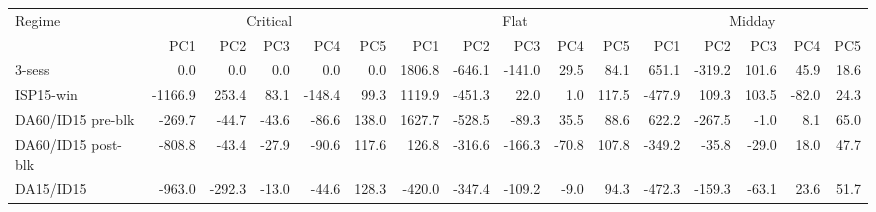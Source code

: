 \begin{tabular}{l r r r r r r r r r r r r r r r}
\toprule
Regime & \multicolumn{5}{c}{Critical} & \multicolumn{5}{c}{Flat} & \multicolumn{5}{c}{Midday} \\
\cmidrule(lr){2-6}\cmidrule(lr){7-11}\cmidrule(lr){12-16}
 & PC1 & PC2 & PC3 & PC4 & PC5 & PC1 & PC2 & PC3 & PC4 & PC5 & PC1 & PC2 & PC3 & PC4 & PC5 \\
\midrule
3-sess & 0.0 & 0.0 & 0.0 & 0.0 & 0.0 & 1806.8 & -646.1 & -141.0 & 29.5 & 84.1 & 651.1 & -319.2 & 101.6 & 45.9 & 18.6 \\
ISP15-win & -1166.9 & 253.4 & 83.1 & -148.4 & 99.3 & 1119.9 & -451.3 & 22.0 & 1.0 & 117.5 & -477.9 & 109.3 & 103.5 & -82.0 & 24.3 \\
DA60/ID15 pre-blk & -269.7 & -44.7 & -43.6 & -86.6 & 138.0 & 1627.7 & -528.5 & -89.3 & 35.5 & 88.6 & 622.2 & -267.5 & -1.0 & 8.1 & 65.0 \\
DA60/ID15 post-blk & -808.8 & -43.4 & -27.9 & -90.6 & 117.6 & 126.8 & -316.6 & -166.3 & -70.8 & 107.8 & -349.2 & -35.8 & -29.0 & 18.0 & 47.7 \\
DA15/ID15 & -963.0 & -292.3 & -13.0 & -44.6 & 128.3 & -420.0 & -347.4 & -109.2 & -9.0 & 94.3 & -472.3 & -159.3 & -63.1 & 23.6 & 51.7 \\
\bottomrule
\end{tabular}